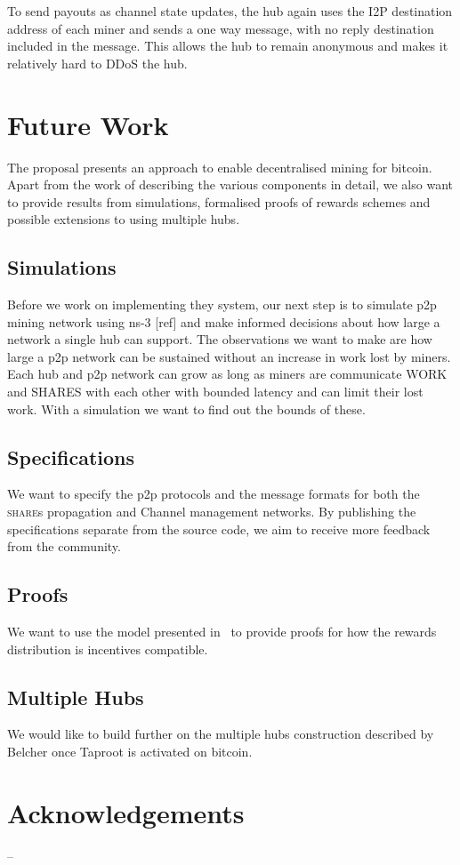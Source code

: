 \documentclass{article}
\begin{document}
To send payouts as channel state updates, the hub again uses the I2P
destination address of each miner and sends a one way message, with no
reply destination included in the message. This allows the hub to
remain anonymous and makes it relatively hard to DDoS the hub.

\section{Future Work}

The proposal presents an approach to enable decentralised mining for
bitcoin. Apart from the work of describing the various components in
detail, we also want to provide results from simulations, formalised
proofs of rewards schemes and possible extensions to using multiple
hubs.

\subsection{Simulations}

Before we work on implementing they system, our next step is to
simulate p2p mining network using ns-3 [ref] and make informed
decisions about how large a network a single hub can support. The
observations we want to make are how large a p2p network can be
sustained without an increase in work lost by miners. Each hub and p2p
network can grow as long as miners are communicate WORK and SHARES
with each other with bounded latency and can limit their lost
work. With a simulation we want to find out the bounds of these.

\subsection{Specifications}

We want to specify the p2p protocols and the message formats for both
the \textsc{share}s propagation and Channel management networks. By
publishing the specifications separate from the source code, we aim to
receive more feedback from the community.

\subsection{Proofs}

We want to use the model presented in~\cite{incentives-compatible} to
provide proofs for how the rewards distribution is incentives
compatible.

\subsection{Multiple Hubs}

We would like to build further on the multiple hubs construction
described by Belcher once Taproot is activated on bitcoin.

\section{Acknowledgements}

--

 

\end{document}
